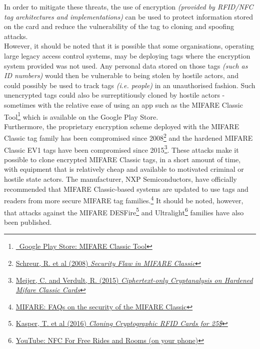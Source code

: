 \noindent In order to mitigate these threats, the use of encryption \textit{(provided by RFID/NFC tag architectures and implementations)} can be used to protect information stored on the card and reduce the vulnerability of the tag to cloning and spoofing attacks.\\

\noindent However, it should be noted that it is possible that some organisations, operating large legacy access control systems, may be deploying tags where the encryption system provided was not used. Any personal data stored on those tags \textit{(such as ID numbers)} would then be vulnerable to being stolen by hostile actors, and could possibly be used to track tags \textit{(i.e. people)} in an unauthorised fashion. Such unencrypted tags could also be surreptitiously cloned by hostile actors - sometimes with the relative ease of using an app such as the MIFARE Classic Tool\footnote{\href{https://play.google.com/store/apps/details?id=de.syss.MifareClassicTool&hl=en_GB&rdid=de.syss.MifareClassicTool}{\faGooglePlay\ Google Play Store: MIFARE Classic Tool}} which is available on the Google Play Store.\\

\noindent Furthermore, the proprietary encryption scheme deployed with the MIFARE Classic tag family has been compromised since 2008\footnote{\href{http://www.cs.ru.nl/~flaviog/publications/Security_Flaw_in_MIFARE_Classic.pdf}{Schreur, R. et al (2008) \textit{Security Flaw in MIFARE Classic}}} and the hardened MIFARE Classic EV1 tags have been compromised since 2015\footnote{\href{http://cs.ru.nl/~rverdult/Ciphertext-only_Cryptanalysis_on_Hardened_Mifare_Classic_Cards-CCS_2015.pdf}{Meijer, C. and Verdult, R. (2015) \textit{Ciphertext-only Cryptanalysis on Hardened Mifare Classic Cards}}}. These attacks make it possible to clone encrypted MIFARE Classic tags, in a short amount of time, with equipment that is relatively cheap and available to motivated criminal or hostile state actors. The manufacturer, NXP Semiconductors, have officially recommended that MIFARE Classic-based systems are updated to use tags and readers from more secure MIFARE tag families.\footnote{\href{https://www.mifare.net/en/products/chip-card-ics/mifare-classic/frequently-asked-questions/}{MIFARE: FAQs on the security of the MIFARE Classic}} It should be noted, however, that attacks against the MIFARE DESFire\footnote{\href{http://www.proxmark.org/files/Documents/13.56\%20MHz\%20-\%20MIFARE\%20DESFire/Cloning_Cryptographic_RFID_Cards_for_25USD-WISSEC_2010.pdf}{Kasper, T. et al (2016) \textit{Cloning Cryptographic RFID Cards for 25\$}}} and Ultralight\footnote{\href{https://www.youtube.com/watch?v=-uvvVMHnC3c}{YouTube: NFC For Free Rides and Rooms (on your phone)}} families have also been published.\\

